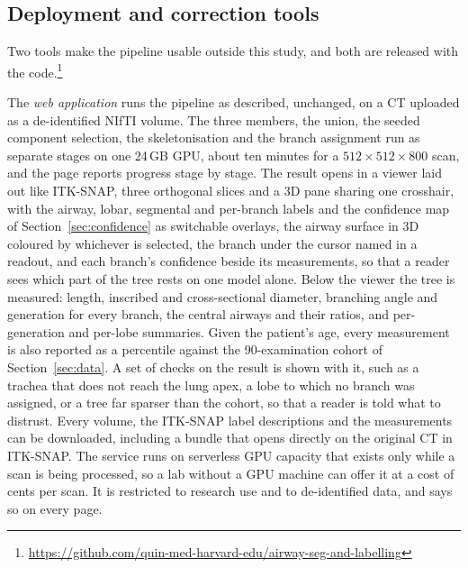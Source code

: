 \documentclass[runningheads]{llncs}
\begin{document}
\subsection{Deployment and correction tools}
\label{sec:tools}
Two tools make the pipeline usable outside this study, and both are released
with the code.\footnote{\url{https://github.com/quin-med-harvard-edu/airway-seg-and-labelling}}

The \emph{web application} runs the pipeline as described, unchanged, on a CT
uploaded as a de-identified NIfTI volume. The three members, the union, the
seeded component selection, the skeletonisation and the branch assignment run
as separate stages on one 24\,GB GPU, about ten minutes for a
$512\times512\times800$ scan, and the page reports progress stage by stage.
The result opens in a viewer laid out like ITK-SNAP, three orthogonal slices
and a 3D pane sharing one crosshair, with the airway, lobar, segmental and
per-branch labels and the confidence map of Section~\ref{sec:confidence} as
switchable overlays, the airway surface in 3D coloured by whichever is
selected, the branch under the cursor named in a readout, and each branch's
confidence beside its measurements, so that a reader sees which part of the
tree rests on one model alone. Below the viewer the tree is measured: length, inscribed and
cross-sectional diameter, branching angle and generation for every branch,
the central airways and their ratios, and per-generation and per-lobe
summaries. Given the patient's age, every measurement is also reported as a
percentile against the 90-examination cohort of Section~\ref{sec:data}. A
set of checks on the result is shown with it, such as a trachea that does not
reach the lung apex, a lobe to which no branch was assigned, or a tree far
sparser than the cohort, so that a reader is told what to distrust. Every
volume, the ITK-SNAP label descriptions and the measurements can be
downloaded, including a bundle that opens directly on the original CT in
ITK-SNAP. The service runs on
serverless GPU capacity that exists only while a scan is being processed, so a
lab without a GPU machine can offer it at a cost of cents per scan. It is
restricted to research use and to de-identified data, and says so on every
page.
\end{document}
